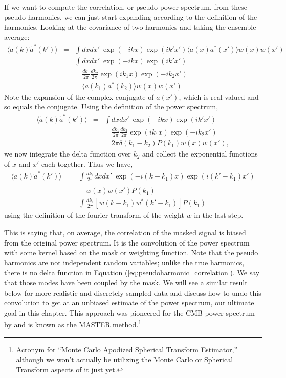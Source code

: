 If we want to compute the correlation, or pseudo-power spectrum, from these pseudo-harmonics, we can just start expanding according to the definition of the harmonics.  Looking at the covariance of two harmonics and taking the ensemble average:
\begin{eqnarray}
  \langle \tilde a(k) \tilde a^*(k') \rangle &= &\int dx dx' \ \exp(-i k x)\exp(i k' x') \langle a(x) a^*(x') \rangle w(x) w(x')  \nonumber \\
  & =& \int dx dx' \ \exp(-i k x)\exp(i k' x')  \nonumber \\
  & & \quad \frac{dk_1}{2\pi} \frac{dk_2}{2\pi} \exp(i k_1 x)\exp(-i k_2 x')  \nonumber \\
  & & \quad \langle a(k_1) a^*(k_2) \rangle w(x) w(x')  
\end{eqnarray}
Note the expansion of the complex conjugate of $a(x')$, which is real valued and so equals the conjugate.  Using the definition of the power spectrum, 
 \begin{eqnarray}
   \langle \tilde a(k) \tilde a^*(k') \rangle  &=& \int  dx dx' \ \exp(-i k x)\exp(i k' x')  \nonumber \\
  & & \quad \frac{dk_1}{2\pi} \frac{dk_2}{2\pi} \exp(i k_1 x)\exp(-i k_2 x')  \nonumber \\
  & & \quad 2\pi \delta(k_1 - k_2) P(k_1) w(x) w(x') ,
\end{eqnarray}
we now integrate the delta function over $k_2$ and collect the exponential functions of $x$ and $x'$ each together.  Thus we have,
 \begin{eqnarray}
   \langle \tilde a(k) \tilde a^*(k') \rangle  &= & \int\frac{dk_1}{2\pi} dx dx' \ \exp(-i (k - k_1) x)\exp(i (k'-k_1) x')  \nonumber \\
  & &  \nonumber \\
   & &  \quad w(x) w(x') P(k_1) \nonumber \\
   &=&  \int\frac{dk_1}{2\pi} \left[  w(k-k_1) w^*(k'-k_1) \right] P(k_1)    \label{eq:pseudoharmonic_correlation} %
\end{eqnarray}
 using the definition of the fourier transform of the weight $w$ in the last step.

 This is saying that, on average, the correlation of the masked signal is biased from the original power spectrum.  It is the convolution of the power spectrum with some kernel based on the mask or weighting function.  Note that the pseudo harmonics are not independent random variables; unlike the true harmonics, there is no delta function in Equation (\ref{eq:pseudoharmonic_correlation}).  We say that those modes have been coupled by the mask.
 We will see a similar result below for more realistic and discretely-sampled data and discuss how to undo this convolution to get at an unbiased estimate of the power spectrum, our ultimate goal in this chapter.  This approach was pioneered for the CMB power spectrum by \citet{2002ApJ...567....2 H} and is known as the MASTER method.\footnote{Acronym for ``Monte Carlo Apodized Spherical Transform Estimator,'' although we won't actually be utilizing the Monte Carlo or Spherical Transform aspects of it just yet.}


